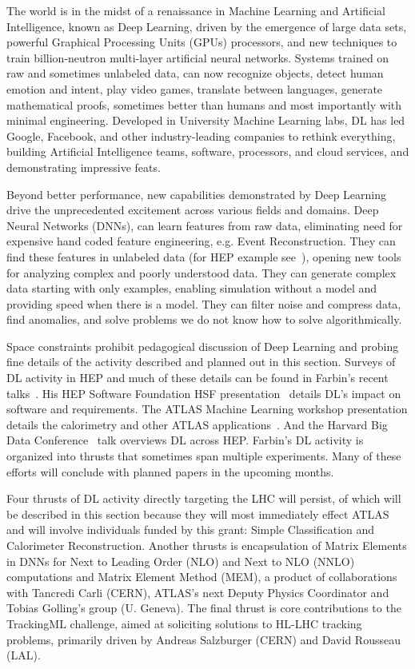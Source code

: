 \label{sec:af_deeplearning}

The world is in the midst of a renaissance in Machine Learning and
Artificial Intelligence, known as Deep Learning, driven by the
emergence of large data sets, powerful Graphical Processing Units
(GPUs) processors, and new techniques to train billion-neutron
multi-layer artificial neural networks. Systems trained on raw and
sometimes unlabeled data, can now recognize objects, detect human
emotion and intent, play video games, translate between languages,
generate mathematical proofs, sometimes better than humans and most
importantly with minimal engineering. Developed in University Machine
Learning labs, DL has led Google, Facebook, and other industry-leading
companies to rethink everything, building Artificial Intelligence
teams, software, processors, and cloud services, and demonstrating
impressive feats.

Beyond better performance, new capabilities demonstrated by Deep
Learning drive the unprecedented excitement across various fields and
domains. Deep Neural Networks (DNNs), can learn features from raw
data, eliminating need for expensive hand coded feature engineering,
e.g. Event Reconstruction. They can find these features in unlabeled
data (for HEP example see~\cite{Racah:2016gnm}), opening new tools for analyzing
complex and poorly understood data. They can generate complex data
starting with only examples, enabling simulation without a model and
providing speed when there is a model. They can filter noise and
compress data, find anomalies, and solve problems we do not know how
to solve algorithmically.

Space constraints prohibit pedagogical discussion of Deep Learning and
probing fine details of the activity described and planned out in this
section. Surveys of DL activity in HEP and much of these details can
be found in Farbin's recent
talks~\cite{DSAtLHC,WireCellWS,AFFermilabSeminar, HeavyFlavorDL,
ConnectingDotsDL,ATLASMLDL, HSFDL, SimonsDL, HarvardDL}. His HEP
Software Foundation HSF presentation~\cite{HSFDL} details DL's impact
on software and requirements. The ATLAS Machine Learning workshop
presentation details the calorimetry and other ATLAS
applications~\cite{ATLASMLDL}. And the Harvard Big Data
Conference~\cite{HarvardDL} talk overviews DL across HEP. Farbin's DL
activity is organized into thrusts that sometimes span multiple
experiments. Many of these efforts will conclude with planned papers
in the upcoming months.

Four thrusts of DL activity directly targeting the LHC will persist,
of which will be described in this section because they will most
immediately effect ATLAS and will involve individuals funded by this
grant: Simple Classification and Calorimeter
Reconstruction. Another thrusts is encapsulation of Matrix Elements in
DNNs for Next to Leading Order (NLO) and Next to NLO (NNLO)
computations and Matrix Element Method (MEM), a product of
collaborations with Tancredi Carli (CERN), ATLAS's next Deputy Physics
Coordinator and Tobias Golling's group (U. Geneva). The final thrust
is core contributions to the TrackingML challenge, aimed at soliciting
solutions to HL-LHC tracking problems, primarily driven by Andreas
Salzburger (CERN) and David Rousseau (LAL). 

